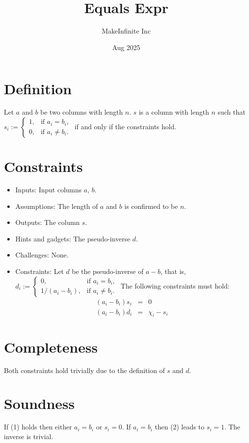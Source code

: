 \documentclass[11pt]{article}
\title{Equals Expr}
\author{MakeInfinite Inc}
\date{Aug 2025}
\begin{document}
\maketitle

\section{Definition}
\noindent Let $a$ and $b$ be two columns with length $n$. $s$ is a column with length $n$ such that $s_i := 
\begin{cases}
1, & \text{if } a_i = b_i,\\
0, & \text{if } a_i \neq b_i.
\end{cases}$ if and only if the constraints hold.
\section{Constraints}
\begin{itemize}
    \item Inputs: Input columns $a$, $b$.
    \item Assumptions: The length of $a$ and $b$ is confirmed to be $n$.
    \item Outputs: The column $s$.
    \item Hints and gadgets: The pseudo-inverse $d$.
    \item Challenges: None.
    \item Constraints:
    Let $d$ be the pseudo-inverse of $a-b$, that is,
    $d_i := 
\begin{cases}
0, & \text{if } a_i = b_i,\\
1/(a_i-b_i), & \text{if } a_i \neq b_i.
\end{cases}$
    The following constraints must hold:
     \begin{eqnarray}
    (a_i-b_i)s_i&=&0\\
    (a_i-b_i)d_i&=&\chi_i-s_i
\end{eqnarray}
\end{itemize}
\section{Completeness}
Both constraints hold trivially due to the definition of $s$ and $d$.
\section{Soundness}
If (1) holds then either $a_i=b_i$ or $s_i=0$. If $a_i=b_i$ then (2) leads to $s_i=1$.
The inverse is trivial. 
\end{document}
